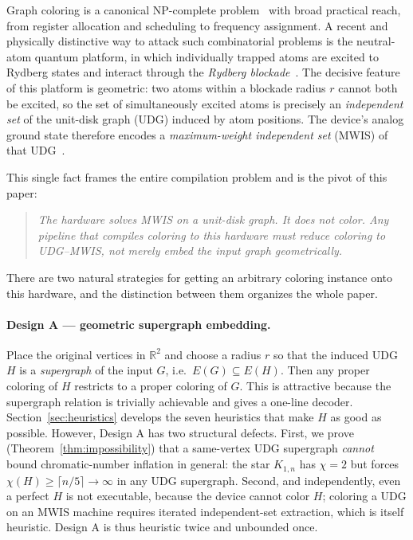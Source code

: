 \documentclass[11pt]{article}
\theoremstyle{definition}
\theoremstyle{remark}
\newcommand{\R}{\mathbb{R}}
\begin{document}
Graph coloring is a canonical NP-complete problem~\cite{Karp1972,GareyJohnson1979}
with broad practical reach, from register allocation and scheduling to frequency
assignment. A recent and physically distinctive way to attack such combinatorial
problems is the neutral-atom quantum platform, in which individually trapped atoms
are excited to Rydberg states and interact through the \emph{Rydberg
blockade}~\cite{Saffman2010,Henriet2021,Scholl2022}. The decisive feature of this
platform is geometric: two atoms within a blockade radius $r$ cannot both be
excited, so the set of simultaneously excited atoms is precisely an
\emph{independent set} of the unit-disk graph (UDG) induced by atom positions.
The device's analog ground state therefore encodes a \emph{maximum-weight
independent set} (MWIS) of that UDG~\cite{Pichler2018,Ebadi2022}.

This single fact frames the entire compilation problem and is the pivot of this
paper:

\begin{quote}
\itshape
The hardware solves MWIS on a unit-disk graph. It does not color. Any pipeline
that compiles coloring to this hardware must \emph{reduce} coloring to UDG--MWIS,
not merely \emph{embed} the input graph geometrically.
\end{quote}

There are two natural strategies for getting an arbitrary coloring instance onto
this hardware, and the distinction between them organizes the whole paper.

\paragraph{Design A --- geometric supergraph embedding.} Place the original
vertices in $\R^2$ and choose a radius $r$ so that the induced UDG $H$ is a
\emph{supergraph} of the input $G$, i.e.\ $E(G)\subseteq E(H)$. Then any proper
coloring of $H$ restricts to a proper coloring of $G$. This is attractive because
the supergraph relation is trivially achievable and gives a one-line decoder.
Section~\ref{sec:heuristics} develops the seven heuristics that make $H$ as good
as possible. However, Design A has two structural defects. First, we prove
(Theorem~\ref{thm:impossibility}) that a same-vertex UDG supergraph
\emph{cannot} bound chromatic-number inflation in general: the star $K_{1,n}$ has
$\chi = 2$ but forces $\chi(H)\ge\lceil n/5\rceil\to\infty$ in any UDG supergraph.
Second, and independently, even a perfect $H$ is not executable, because the
device cannot color $H$; coloring a UDG on an MWIS machine requires iterated
independent-set extraction, which is itself heuristic. Design A is thus heuristic
twice and unbounded once.
\end{document}
